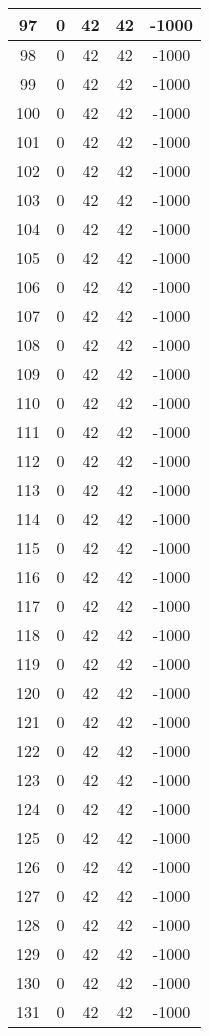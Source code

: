 \documentclass[letterpaper, 12pt]{article}
\begin{document}
\begin{longtable}{|c|c|c|c|c|}
\hline
97 & 0 & 42 & 42 & -1000 \\
\hline
98 & 0 & 42 & 42 & -1000 \\
\hline
99 & 0 & 42 & 42 & -1000 \\
\hline
100 & 0 & 42 & 42 & -1000 \\
\hline
101 & 0 & 42 & 42 & -1000 \\
\hline
102 & 0 & 42 & 42 & -1000 \\
\hline
103 & 0 & 42 & 42 & -1000 \\
\hline
104 & 0 & 42 & 42 & -1000 \\
\hline
105 & 0 & 42 & 42 & -1000 \\
\hline
106 & 0 & 42 & 42 & -1000 \\
\hline
107 & 0 & 42 & 42 & -1000 \\
\hline
108 & 0 & 42 & 42 & -1000 \\
\hline
109 & 0 & 42 & 42 & -1000 \\
\hline
110 & 0 & 42 & 42 & -1000 \\
\hline
111 & 0 & 42 & 42 & -1000 \\
\hline
112 & 0 & 42 & 42 & -1000 \\
\hline
113 & 0 & 42 & 42 & -1000 \\
\hline
114 & 0 & 42 & 42 & -1000 \\
\hline
115 & 0 & 42 & 42 & -1000 \\
\hline
116 & 0 & 42 & 42 & -1000 \\
\hline
117 & 0 & 42 & 42 & -1000 \\
\hline
118 & 0 & 42 & 42 & -1000 \\
\hline
119 & 0 & 42 & 42 & -1000 \\
\hline
120 & 0 & 42 & 42 & -1000 \\
\hline
121 & 0 & 42 & 42 & -1000 \\
\hline
122 & 0 & 42 & 42 & -1000 \\
\hline
123 & 0 & 42 & 42 & -1000 \\
\hline
124 & 0 & 42 & 42 & -1000 \\
\hline
125 & 0 & 42 & 42 & -1000 \\
\hline
126 & 0 & 42 & 42 & -1000 \\
\hline
127 & 0 & 42 & 42 & -1000 \\
\hline
128 & 0 & 42 & 42 & -1000 \\
\hline
129 & 0 & 42 & 42 & -1000 \\
\hline
130 & 0 & 42 & 42 & -1000 \\
\hline
131 & 0 & 42 & 42 & -1000 \\

\end{longtable}
\end{document}
